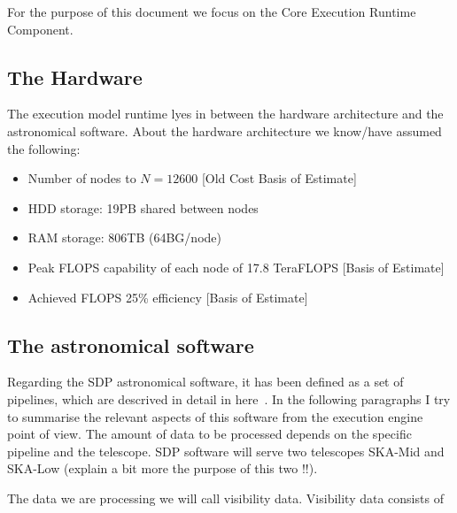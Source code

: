 \documentclass[11pt,a4paper]{article}
\newcommand{\Nfcorr}{\ensuremath{N_{\rm f,corr}}}
\begin{document}
For the purpose of this document we focus on the Core Execution Runtime Component.






\subsection{The Hardware}
The execution model runtime lyes in between the hardware architecture and the astronomical software.
About the hardware architecture we know/have assumed the following:

\begin{itemize}
\item Number of nodes to $N=12600$  [Old Cost Basis of Estimate]
\item HDD storage: 19PB shared between nodes
\item RAM storage: 806TB (64BG/node)
\item Peak FLOPS capability of each node of 17.8 TeraFLOPS [Basis of Estimate]
\item Achieved FLOPS 25\% efficiency [Basis of Estimate]
\end{itemize}

\subsection{The astronomical software}
Regarding the SDP astronomical software, it has been defined as a set of pipelines, which are descrived in detail in here~\cite{SDPpipelines}.
In the following paragraphs I try to summarise the relevant aspects of this software from the execution engine point of view.
The amount of data to be processed depends on the specific pipeline and the telescope. 
SDP software will serve two telescopes SKA-Mid and SKA-Low (explain a bit more the purpose of this two !!). 

The data we are processing we will call visibility data. Visibility data consists of 
\end{document}
